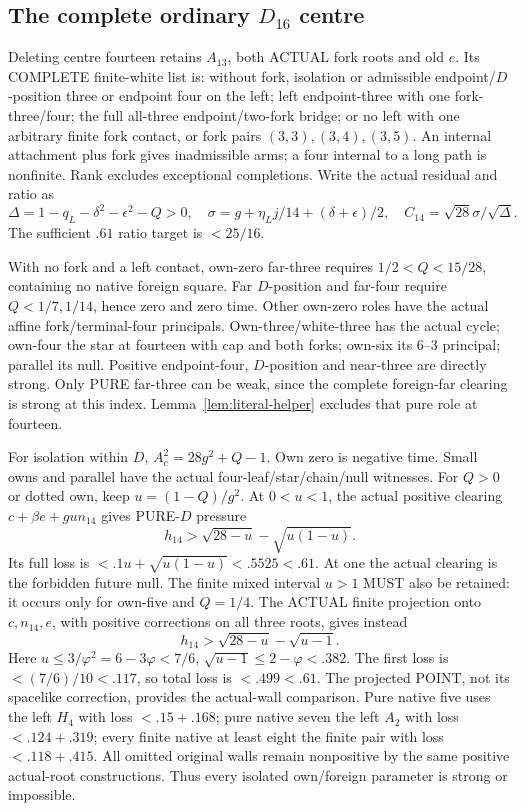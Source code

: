 \subsection{The complete ordinary \(D_{16}\) centre}
\label{app:arithD16ordinarycentre}

Deleting centre fourteen retains \(A_{13}\),
both ACTUAL fork roots and old \(e\).
Its COMPLETE finite-white list is:
without fork, isolation or admissible
endpoint/\(D\)-position three or endpoint
four on the left;
left endpoint-three with one fork-three/four;
the full all-three endpoint/two-fork bridge;
or no left with one arbitrary finite fork
contact, or fork pairs
\((3,3),(3,4),(3,5)\).
An internal attachment plus fork gives
inadmissible arms; a four internal to
a long path is nonfinite.
Rank excludes exceptional completions.
Write the actual residual and ratio as
\[
 \Delta=1-q_L-\delta^2-\epsilon^2-Q>0,\quad
 \sigma=g+\eta_Lj/14+(\delta+\epsilon)/2,\quad
                              C_{14}=\sqrt{28}\sigma/\sqrt\Delta .
\]
The sufficient \(.61\) ratio target is
\(<25/16\).

With no fork and a left contact,
own-zero far-three requires
\(1/2<Q<15/28\), containing no native
foreign square.
Far \(D\)-position and far-four require
\(Q<1/7,1/14\), hence zero and zero
time.  Other own-zero roles have
the actual affine fork/terminal-four
principals.
Own-three/white-three has the actual
cycle; own-four the star at fourteen
with cap and both forks; own-six its
\(6\)--\(3\) principal; parallel its null.
Positive endpoint-four, \(D\)-position
and near-three are directly strong.
Only PURE far-three can be weak, since
the complete foreign-far clearing is
strong at this index.
Lemma~\ref{lem:literal-helper} excludes
that pure role at fourteen.

For isolation within \(D\),
\(A_c^2=28g^2+Q-1\).
Own zero is negative time.
Small owns and parallel have the actual
four-leaf/star/chain/null witnesses.
For \(Q>0\) or dotted own, keep
\(u=(1-Q)/g^2\).
At \(0<u<1\), the actual positive
clearing \(c+\beta e+gu n_{14}\)
gives PURE-\(D\) pressure
\[
             h_{14}>\sqrt{28-u}-\sqrt{u(1-u)} .
\]
Its full loss is \(<.1u+\sqrt{u(1-u)}
<.5525<.61\).
At one the actual clearing is the
forbidden future null.
The finite mixed interval \(u>1\)
MUST also be retained:
it occurs only for own-five and
\(Q=1/4\).
The ACTUAL finite projection onto
\(c,n_{14},e\), with positive corrections
on all three roots, gives instead
\[
                      h_{14}>\sqrt{28-u}-\sqrt{u-1}.
\]
Here \(u\le3/\varphi^2=6-3\varphi<7/6\),
\(\sqrt{u-1}\le2-\varphi<.382\).
The first loss is \(<(7/6)/10<.117\),
so total loss is \(<.499<.61\).
The projected POINT, not its spacelike
correction, provides the actual-wall
comparison.
Pure native five uses the left \(H_4\)
with loss \(<.15+.168\);
pure native seven the left \(A_2\)
with loss \(<.124+.319\);
every finite native at least eight
the finite pair with loss \(<.118+.415\).
All omitted original walls remain
nonpositive by the same positive
actual-root constructions.
Thus every isolated own/foreign parameter
is strong or impossible.

